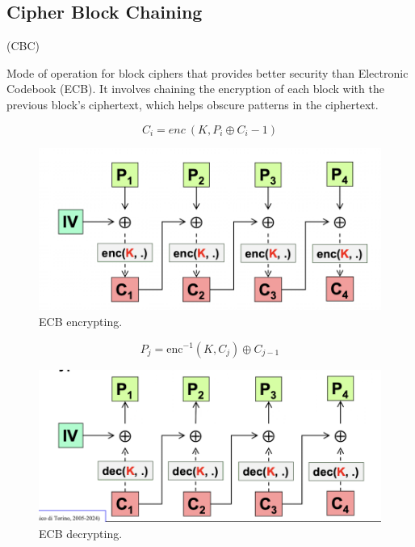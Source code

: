 \clearpage
\subsection{Cipher Block Chaining}

\begin{center}
    (CBC)
\end{center}
Mode of operation for block ciphers that provides better security than Electronic Codebook (ECB). It involves chaining the encryption of each block with the previous block’s ciphertext, which helps obscure patterns in the ciphertext.


\begin{multicols}{2}
    \begin{equation*}
        \boxed{C_i = enc \ (K, P_i \oplus C_i-1)}
    \end{equation*}
    \begin{figure}[H]
        \includegraphics[width=\linewidth]{Images/Cryptography/CBCEncrypt.png}
        \caption{ECB encrypting.}
    \end{figure}
    \columnbreak
    \begin{equation*}
        \boxed{P_j = \text{enc}^{-1}(K, C_j) \oplus C_{j-1}}
    \end{equation*}
    \begin{figure}[H]
        \includegraphics[width=\linewidth]{Images/Cryptography/CBCDecrypt.png}
        \caption{ECB decrypting.}
    \end{figure}
\end{multicols}

